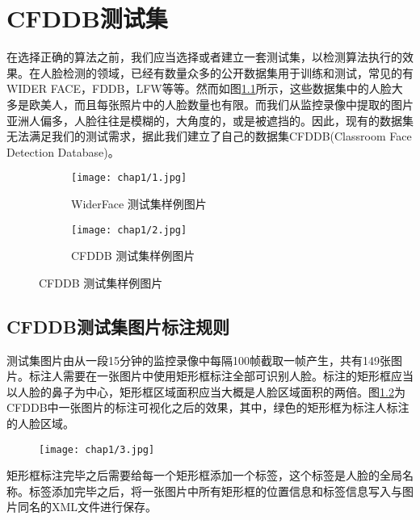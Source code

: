 \chapter{CFDDB测试集}
\label{chap:establishCFDDB}

在选择正确的算法之前，我们应当选择或者建立一套测试集，以检测算法执行的效果。在人脸检测的领域，已经有数量众多的公开数据集用于训练和测试，常见的有WIDER FACE\cite{yang2016wider}，FDDB\cite{fddbTech}，LFW\cite{huang2007labeled}等等。然而如图\ref{fig:chap1:pic}所示，这些数据集中的人脸大多是欧美人，而且每张照片中的人脸数量也有限。而我们从监控录像中提取的图片亚洲人偏多，人脸往往是模糊的，大角度的，或是被遮挡的。因此，现有的数据集无法满足我们的测试需求，据此我们建立了自己的数据集CFDDB(Classroom Face Detection Database)。


\begin{figure}[!htp]
	\centering
	\begin{subfigure}{6cm}
		\centering
		\texttt{[image: chap1/1.jpg]}
		\caption{WiderFace 测试集样例图片}
	\end{subfigure}
	\hspace{4em}
	\begin{subfigure}{6cm}
		\centering
		\texttt{[image: chap1/2.jpg]}
		\caption{CFDDB 测试集样例图片}
	\end{subfigure}
	\label{fig:chap1:pic}
\end{figure}


\section{CFDDB测试集图片标注规则}

测试集图片由从一段15分钟的监控录像中每隔100帧截取一帧产生，共有149张图片。标注人需要在一张图片中使用矩形框标注全部可识别人脸。标注的矩形框应当以人脸的鼻子为中心，矩形框区域面积应当大概是人脸区域面积的两倍。图\ref{fig:chap1:cfddblbexp}为CFDDB中一张图片的标注可视化之后的效果，其中，绿色的矩形框为标注人标注的人脸区域。

\begin{figure}[!htp]
	\centering
	\texttt{[image: chap1/3.jpg]}
	\label{fig:chap1:cfddblbexp}
\end{figure}

矩形框标注完毕之后需要给每一个矩形框添加一个标签，这个标签是人脸的全局名称。标签添加完毕之后，将一张图片中所有矩形框的位置信息和标签信息写入与图片同名的XML文件进行保存。

